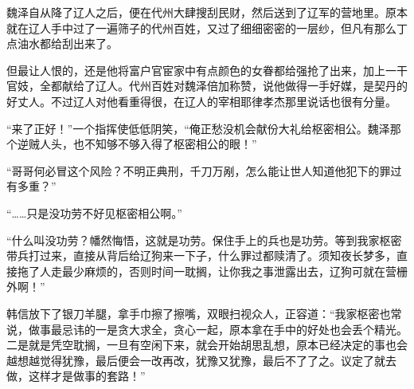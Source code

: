 魏泽自从降了辽人之后，便在代州大肆搜刮民财，然后送到了辽军的营地里。原本就在辽人手中过了一遍筛子的代州百姓，又过了细细密密的一层纱，但凡有那么丁点油水都给刮出来了。

但最让人恨的，还是他将富户官宦家中有点颜色的女眷都给强抢了出来，加上一干官妓，全都献给了辽人。代州百姓对魏泽倍加称赞，说他做得一手好媒，是契丹的好丈人。不过辽人对他看重得很，在辽人的宰相耶律孝杰那里说话也很有分量。

“来了正好！”一个指挥使低低阴笑，“俺正愁没机会献份大礼给枢密相公。魏泽那个逆贼人头，也不知够不够入得了枢密相公的眼！”

“哥哥何必冒这个风险？不明正典刑，千刀万剐，怎么能让世人知道他犯下的罪过有多重？”

“……只是没功劳不好见枢密相公啊。”

“什么叫没功劳？幡然悔悟，这就是功劳。保住手上的兵也是功劳。等到我家枢密带兵打过来，直接从背后给辽狗来一下子，什么罪过都赎清了。须知夜长梦多，直接拖了人走最少麻烦的，否则时间一耽搁，让你我之事泄露出去，辽狗可就在营栅外啊！”

韩信放下了银刀羊腿，拿手巾擦了擦嘴，双眼扫视众人，正容道：“我家枢密也常说，做事最忌讳的一是贪大求全，贪心一起，原本拿在手中的好处也会丢个精光。二是就是凭空耽搁，一旦有空闲下来，就会开始胡思乱想，原本已经决定的事也会越想越觉得犹豫，最后便会一改再改，犹豫又犹豫，最后不了了之。议定了就去做，这样才是做事的套路！”

